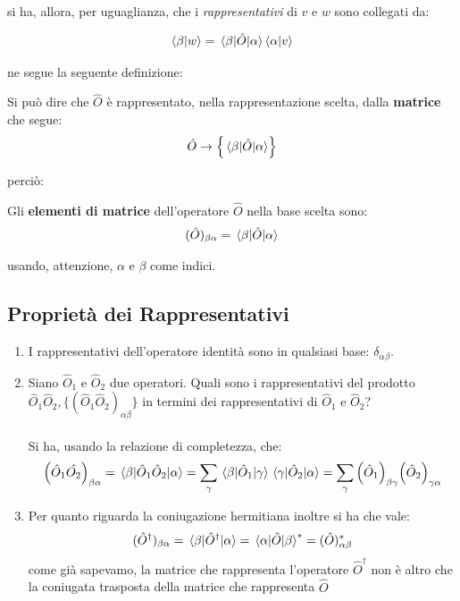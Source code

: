 	si ha, allora, per uguaglianza, che i \textit{rappresentativi} di $v$ e $w$ sono collegati da:
	
\begin{align*}
	\braket{\beta}{w} = \mel{\beta}{\hat{O}}{\alpha} \braket{\alpha}{v}
\end{align*}

	ne segue la seguente definizione:
	
\begin{mydef}
	Si può dire che $\hat{O}$ è rappresentato, nella rappresentazione scelta, dalla \textbf{matrice} che segue:
\begin{align*}
	\hat{O} \to \qty{\mel{\beta}{\hat{O}}{\alpha}}
\end{align*}
\end{mydef}

	perciò:
	
\begin{mydef}
	Gli \textbf{elementi di matrice} dell'operatore $\hat{O}$ nella base scelta sono:
\begin{align*}
	(\hat{O})_{\beta \alpha} = \mel{\beta}{\hat{O}}{\alpha}
\end{align*}
\end{mydef}
	
	usando, attenzione, $\alpha$ e $\beta$ come indici.

\subsection{Proprietà dei Rappresentativi}
	
\begin{enumerate}[label=\arabic*)]
	\item I rappresentativi dell'operatore identità sono in qualsiasi base: $\delta_{\alpha \beta}$.
	\item Siano $\hat{O}_1$ e $\hat{O}_2$ due operatori. Quali sono i rappresentativi del prodotto $\hat{O}_1\hat{O}_2, \{(\hat{O}_1\hat{O}_2)_{\alpha \beta}\}$ in termini dei rappresentativi di $\hat{O}_1$ e $\hat{O}_2$?
	\\
	\\
		Si ha, usando la relazione di completezza, che:
	\begin{align*}
		\qty(\hat{O}_1\hat{O_2})_{\beta \alpha} = \mel{\beta}{\hat{O}_1\hat{O}_2}{\alpha} = \sum_{\gamma} \mel{\beta}{\hat{O}_1}{\gamma} \mel{\gamma}{\hat{O}_2}{\alpha} = \sum_{\gamma} \qty(\hat{O}_1)_{\beta \gamma} \qty(\hat{O}_2)_{\gamma \alpha}
	\end{align*}
	
	\item Per quanto riguarda la coniugazione hermitiana inoltre si ha che vale:
	\begin{align*}
		(\hat{O}^{\dagger})_{\beta \alpha} = \mel{\beta}{\hat{O}^{\dagger}}{\alpha} = \mel{\alpha}{\hat{O}}{\beta}^* = (\hat{O})_{\alpha \beta}^*
	\end{align*}
	come già sapevamo, la matrice che rappresenta l'operatore $\hat{O}^{\dagger}$ non è altro che la coniugata trasposta della matrice che rappresenta $\hat{O}$
\end{enumerate}
	
